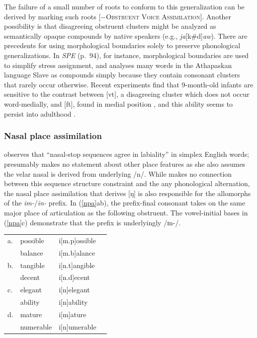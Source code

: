 The failure of a small number of roots to conform to this generalization can be derived by marking such roots [$-$\textsc{Obstruent Voice Assimilation}]. Another possibility is that disagreeing obstruent clusters might be analyzed as semantically opaque compounds by native speakers (e.g., \emph{ja}[k\#d]\emph{aw}). There are precedents for using morphological boundaries solely to preserve phonological generalizations. In \emph{SPE} (p.~94), for instance, morphological boundaries are used to simplify stress assignment, and \citet[][546]{Rice2009d} analyses many words in the Athapaskan language Slave as compounds simply because they contain consonant clusters that rarely occur otherwise. Recent experiments find that 9-month-old infants are sensitive to the contrast between [vt], a disagreeing cluster which does not occur word-medially, and [ft], found in medial position \citep{Mattys2001b}, and this ability seems to persist into adulthood \citep{McQueen1998}.

\subsubsection{Nasal place assimilation} \label{npasection}

\citet[][175]{Pierrehumbert1994} observes that ``nasal-stop sequences agree in labiality'' in simplex English words; \citeauthor{Pierrehumbert1994} presumably makes no statement about other place features as she also assumes the velar nasal is derived from underlying /n/. While \citeauthor{Pierrehumbert1994} makes no connection between this sequence structure constraint and the any phonological alternation, the nasal place assimilation that derives [ŋ] is also responsible for the allomorphs of the \emph{im-}/\emph{in-} prefix. In (\ref{npa}ab), the prefix-final consonant takes on the same major place of articulation as the following obstruent. The vowel-initial bases in (\ref{npa}c) demonstrate that the prefix is underlyingly /ɪn-/. 

\begin{example} \label{npa}
\begin{tabular}{l l l l}
a. & possible  & i[m.p]ossible \\
   & balance   & i[m.b]alance  \\
b. & tangible  & i[n.t]angible \\
   & decent    & i[n.d]ecent   \\
c. & elegant   & i[n]elegant   \\
   & ability   & i[n]ability   \\
d. & mature    & i[m]ature     \\
   & numerable & i[n]umerable  \\
\end{tabular} 
\end{example}

